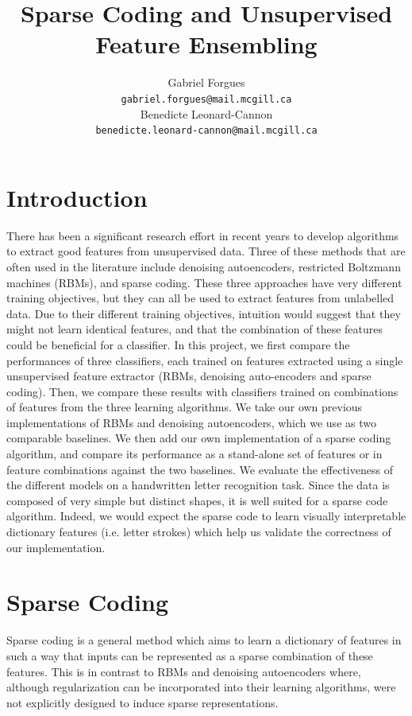 \documentclass{article} %
\title{Sparse Coding and Unsupervised Feature Ensembling}
\author{
Gabriel Forgues \\
\texttt{gabriel.forgues@mail.mcgill.ca} \\
\And 
Benedicte Leonard-Cannon \\
\texttt{benedicte.leonard-cannon@mail.mcgill.ca} \\
}
\begin{document}
\maketitle

\section{Introduction}
There has been a significant research effort in recent years to develop algorithms to extract good features from unsupervised data. Three of these methods that are often used in the literature include denoising autoencoders, restricted Boltzmann machines (RBMs), and sparse coding. These three approaches have very different training objectives, but they can all be used to extract features from unlabelled data. Due to their different training objectives, intuition would suggest that they might not learn identical features, and that the combination of these features could be beneficial for a classifier. In this project, we first compare the performances of three classifiers, each trained on features extracted using a single unsupervised feature extractor (RBMs, denoising auto-encoders and sparse coding). Then, we compare these results with classifiers trained on combinations of features from the three learning algorithms. We take our own previous implementations of RBMs and denoising autoencoders, which we use as two comparable baselines. We then add our own implementation of a sparse coding algorithm, and compare its performance as a stand-alone set of features or in feature combinations against the two baselines. We evaluate the effectiveness of the different models on a handwritten letter recognition task. Since the data is composed of very simple but distinct shapes, it is well suited for a sparse code algorithm. Indeed, we would expect the sparse code to learn visually interpretable dictionary features (i.e. letter strokes) which help us validate the correctness of our implementation.

\section{Sparse Coding}
Sparse coding is a general method which aims to learn a dictionary of features in such a way that inputs can be represented as a sparse combination of these features. This is in contrast to RBMs and denoising autoencoders where, although regularization can be incorporated into their learning algorithms, were not explicitly designed to induce sparse representations.
\end{document}
